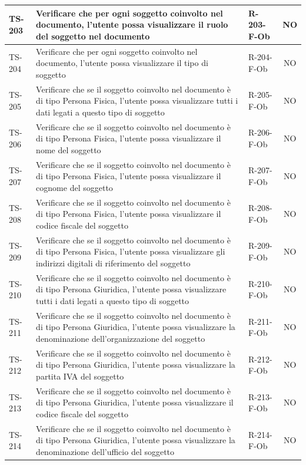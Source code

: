 \documentclass[a4paper,12pt]{article}
\begin{document}
\begin{longtable}{|p{1.5cm}|p{8.3cm}|p{2.4cm}|c|}
\hline
TS-203 & Verificare che per ogni soggetto coinvolto nel documento, l'utente possa visualizzare il ruolo del soggetto nel documento & R-203-F-Ob & NO \\
\hline
TS-204 & Verificare che per ogni soggetto coinvolto nel documento, l'utente possa visualizzare il tipo di soggetto & R-204-F-Ob & NO \\
\hline
TS-205 & Verificare che se il soggetto coinvolto nel documento è di tipo Persona Fisica, l'utente possa visualizzare tutti i dati legati a questo tipo di soggetto & R-205-F-Ob & NO \\
\hline
TS-206 & Verificare che se il soggetto coinvolto nel documento è di tipo Persona Fisica, l'utente possa visualizzare il nome del soggetto & R-206-F-Ob & NO \\
\hline
TS-207 & Verificare che se il soggetto coinvolto nel documento è di tipo Persona Fisica, l'utente possa visualizzare il cognome del soggetto & R-207-F-Ob & NO \\
\hline
TS-208 & Verificare che se il soggetto coinvolto nel documento è di tipo Persona Fisica, l'utente possa visualizzare il codice fiscale del soggetto & R-208-F-Ob & NO \\
\hline
TS-209 & Verificare che se il soggetto coinvolto nel documento è di tipo Persona Fisica, l'utente possa visualizzare gli indirizzi digitali di riferimento del soggetto & R-209-F-Ob & NO \\
\hline
TS-210 & Verificare che se il soggetto coinvolto nel documento è di tipo Persona Giuridica, l'utente possa visualizzare tutti i dati legati a questo tipo di soggetto & R-210-F-Ob & NO \\
\hline
TS-211 & Verificare che se il soggetto coinvolto nel documento è di tipo Persona Giuridica, l'utente possa visualizzare la denominazione dell'organizzazione del soggetto & R-211-F-Ob & NO \\
\hline
TS-212 & Verificare che se il soggetto coinvolto nel documento è di tipo Persona Giuridica, l'utente possa visualizzare la partita IVA del soggetto & R-212-F-Ob & NO \\
\hline
TS-213 & Verificare che se il soggetto coinvolto nel documento è di tipo Persona Giuridica, l'utente possa visualizzare il codice fiscale del soggetto & R-213-F-Ob & NO \\
\hline
TS-214 & Verificare che se il soggetto coinvolto nel documento è di tipo Persona Giuridica, l'utente possa visualizzare la denominazione dell'ufficio del soggetto & R-214-F-Ob & NO \\

\end{longtable}
\end{document}

